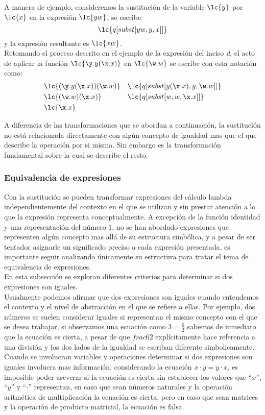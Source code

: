 A manera de ejemplo, consideremos la sustitución de la variable \(\lc{y}\) por \(\lc{x}\)
en la expresión \(\lc{y w}\), se escribe \[\lc{q[subst[y w, y, x]]}\]  y la
expresión resultante es \(\lc{x w}\). \\

Retomando el proceso descrito en el ejemplo de la expresión del inciso \emph{d},
el acto de aplicar la función \(\lc{\y.y(\x.x)}\) en \(\lc{\w.w}\) se escribe
con esta notación como:
\begin{align*} 
  &\lc{(\y.y(\x.x))(\w.w)} & &\lc{q[subst[y(\x.x), y, \w.w]]} \\
  &\lc{(\w.w)(\x.x)} & &\lc{q[subst[w,w,\x.x]]} \\
  &\lc{\x.x} & &
\end{align*}

A diferencia de las transformaciones que se abordan a continuación, la
sustitución no está relacionada directamente con algún concepto de igualdad mas
que el que describe la operación por si misma. Sin embargo es la transformación
fundamental sobre la cual se describe el resto. \\

\subsubsection{Equivalencia de expresiones}

Con la sustitución se pueden transformar expresiones del cálculo lambda
independientemente del contexto en el que se utilizan y sin prestar atención a
lo que la expresión representa conceptualmente. A excepción de la función
identidad y una representación del número 1, no se han abordado expresiones que
representen algún concepto mas allá de su estructura simbólica, y a pesar de ser
tentador asignarle un significado preciso a cada expresión presentada, es
importante seguir analizando únicamente su estructura para tratar el tema de
equivalencia de expresiones. \\

En esta subsección se exploran diferentes criterios para determinar si dos
expresiones son iguales. \\

Usualmente podemos afirmar que dos expresiones son iguales cuando entendemos el
contexto y el nivel de abstracción en el que se refiere a ellas. Por ejemplo,
dos números se suelen considerar iguales si representan el mismo concepto con el
que se desea trabajar, si observamos una ecuación como \(3=\frac{6}{2}\) sabemos
de inmediato que la ecuación es cierta, a pesar de que \(frac{6}{2}\)
explícitamente hace referencia a una división y los dos lados de la igualdad se
escriban diferente simbolicamente. Cuando se involucran variables y operaciones
determinar si dos expresiones son iguales involucra mas información:
considerando la ecuación \(x\cdot y=y\cdot x\), es imposible poder aseverar si
la ecuación es cierta sin establecer los valores que ``\(x\)'', ``\(y\)'' y
``\(\cdot\)'' representan, en caso que sean números naturales y la operación
aritmética de multiplicación la ecuación es cierta, pero en caso que sean
matrices y la operación de producto matricial, la ecuación es falsa. \\

